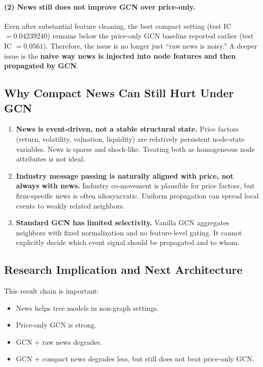 \paragraph{(2) News still does not improve GCN over price-only.}
Even after substantial feature cleaning, the best compact setting (test IC $=0.04239240$) remains below the price-only GCN baseline reported earlier (test IC $=0.0561$). Therefore, the issue is no longer just ``raw news is noisy.'' A deeper issue is the \textbf{naive way news is injected into node features and then propagated by GCN}.

\subsection{Why Compact News Can Still Hurt Under GCN}

\begin{enumerate}
\item \textbf{News is event-driven, not a stable structural state.}
Price factors (return, volatility, valuation, liquidity) are relatively persistent node-state variables. News is sparse and shock-like. Treating both as homogeneous node attributes is not ideal.

\item \textbf{Industry message passing is naturally aligned with price, not always with news.}
Industry co-movement is plausible for price factors, but firm-specific news is often idiosyncratic. Uniform propagation can spread local events to weakly related neighbors.

\item \textbf{Standard GCN has limited selectivity.}
Vanilla GCN aggregates neighbors with fixed normalization and no feature-level gating. It cannot explicitly decide which event signal should be propagated and to whom.
\end{enumerate}

\subsection{Research Implication and Next Architecture}

This result chain is important:
\begin{itemize}
\item News helps tree models in non-graph settings.
\item Price-only GCN is strong.
\item GCN + raw news degrades.
\item GCN + compact news degrades less, but still does not beat price-only GCN.
\end{itemize}

